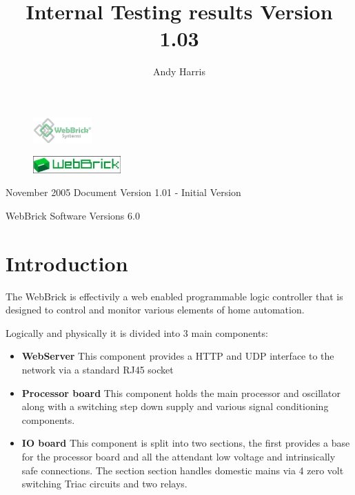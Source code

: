 \documentclass[a4paper,12pt]{article}
\title{\sf{WebBrick 6-64, Model WB10B60}\linebreak Internal Testing results \linebreak Version 1.03}
\author{Andy Harris}
\begin{document}
\maketitle

\begin{figure}[H]
\centering
\includegraphics[width=0.2\textwidth]{Images/WebBrickSystems.png}
\end{figure}

\begin{figure}[H]
\centering
\includegraphics[width=0.3\textwidth]{Images/wb_logo.jpg}
\end{figure}

November 2005 Document Version 1.01 - Initial Version

\begin{description}
\item[WebBrick Software Versions 6.0]
\end{description}

\pagebreak

\tableofcontents

\pagebreak

\section{Introduction}

	The WebBrick is effectivily a web enabled programmable logic controller that is designed to control and monitor various elements of 
	home automation.
	
	Logically and physically it is divided into 3 main components:
	

	\begin{itemize}
	
		\item{\textbf{WebServer}}  This component provides a HTTP and UDP interface to the network via a standard RJ45 socket
		
		\item{\textbf{Processor board}}  This component holds the main processor and oscillator along with a switching step down
		supply and various signal conditioning components.
		
		\item{\textbf{IO board}}  This component is split into two sections, the first provides a base for the processor board and all the
		attendant low voltage and intrinsically safe connections.  The section section handles domestic mains via 4 zero volt switching Triac
		circuits and two relays.


	\end{itemize}
\end{document}
